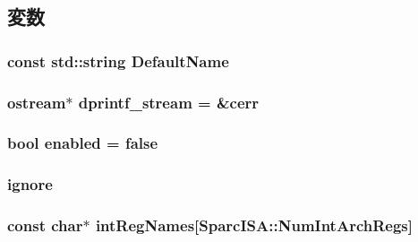 \subsection{変数}
\hypertarget{namespaceTrace_a9e50643ecd3b22ed7ac6c78cfe9c267f}{
\subsubsection[{DefaultName}]{\setlength{\rightskip}{0pt plus 5cm}const std::string {\bf DefaultName}}}
\label{namespaceTrace_a9e50643ecd3b22ed7ac6c78cfe9c267f}
\hypertarget{namespaceTrace_abf77cc0b0db9664cef461fff6749ba72}{
\subsubsection[{dprintf\_\-stream}]{\setlength{\rightskip}{0pt plus 5cm}ostream$\ast$ {\bf dprintf\_\-stream} = \&cerr}}
\label{namespaceTrace_abf77cc0b0db9664cef461fff6749ba72}
\hypertarget{namespaceTrace_a8740ba80e30dd75e71d09fa1dcf04f3d}{
\subsubsection[{enabled}]{\setlength{\rightskip}{0pt plus 5cm}bool {\bf enabled} = false}}
\label{namespaceTrace_a8740ba80e30dd75e71d09fa1dcf04f3d}
\hypertarget{namespaceTrace_a827db600690db919f77af4e28514a655}{
\subsubsection[{ignore}]{ {\bf ignore}}}
\label{namespaceTrace_a827db600690db919f77af4e28514a655}
\hypertarget{namespaceTrace_a4b9af3ca9339fc3f7d523eb06a2c1d40}{
\subsubsection[{intRegNames}]{\setlength{\rightskip}{0pt plus 5cm}const char$\ast$ {\bf intRegNames}\mbox{[}{\bf SparcISA::NumIntArchRegs}\mbox{]}}}
